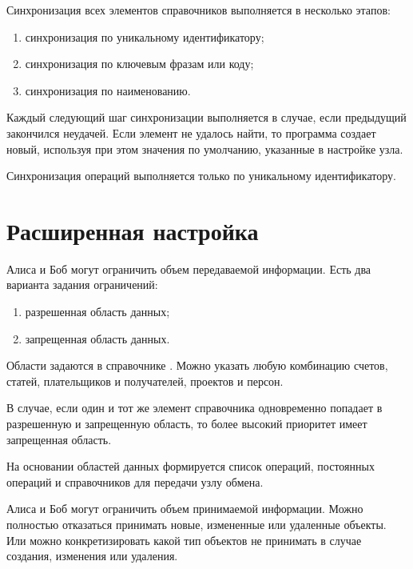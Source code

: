 \documentclass[a4paper,10pt,russian]{sphinxmanual}
\begin{document}
Синхронизация всех элементов справочников выполняется в несколько этапов:
\begin{enumerate}
\def\theenumi{\arabic{enumi}}
\def\labelenumi{\theenumi .}
\makeatletter\def\p@enumii{\p@enumi \theenumi .}\makeatother
\item {} 
синхронизация по уникальному идентификатору;

\item {} 
синхронизация по ключевым фразам или коду;

\item {} 
синхронизация по наименованию.

\end{enumerate}

Каждый следующий шаг синхронизации выполняется в случае, если предыдущий закончился неудачей. Если элемент
не удалось найти, то программа создает новый, используя при этом значения по умолчанию, указанные в настройке узла.

Синхронизация операций выполняется только по уникальному идентификатору.


\section{Расширенная настройка}
\label{\detokenize{teamwork:id8}}
Алиса и Боб могут ограничить объем передаваемой информации. Есть два варианта задания ограничений:
\begin{enumerate}
\def\theenumi{\arabic{enumi}}
\def\labelenumi{\theenumi .}
\makeatletter\def\p@enumii{\p@enumi \theenumi .}\makeatother
\item {} 
разрешенная область данных;

\item {} 
запрещенная область данных.

\end{enumerate}

Области задаются в справочнике . Можно указать любую комбинацию счетов, статей, плательщиков и получателей,
проектов и персон.

В случае, если один и тот же элемент справочника одновременно попадает в разрешенную и запрещенную область, то более
высокий приоритет имеет запрещенная область.

На основании областей данных формируется список операций, постоянных операций и справочников для передачи узлу обмена.

Алиса и Боб могут ограничить объем принимаемой информации. Можно полностью отказаться принимать новые, измененные или удаленные объекты.
Или можно конкретизировать какой тип объектов не принимать в случае создания, изменения или удаления.
\end{document}
